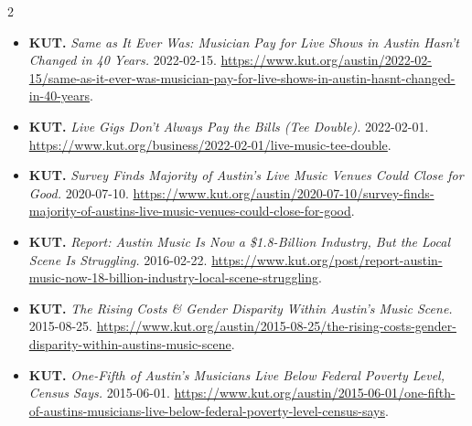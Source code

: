 {\begin{multicols}{2}
\begin{itemize}[itemsep=0pt,topsep=1pt,parsep=0pt,partopsep=0pt,leftmargin=1em]
\item \textbf{KUT.} \textit{Same as It Ever Was: Musician Pay for Live Shows in Austin Hasn’t Changed in 40 Years.} 2022-02-15. \url{https://www.kut.org/austin/2022-02-15/same-as-it-ever-was-musician-pay-for-live-shows-in-austin-hasnt-changed-in-40-years}.
\item \textbf{KUT.} \textit{Live Gigs Don’t Always Pay the Bills (Tee Double).} 2022-02-01. \url{https://www.kut.org/business/2022-02-01/live-music-tee-double}.
\item \textbf{KUT.} \textit{Survey Finds Majority of Austin’s Live Music Venues Could Close for Good.} 2020-07-10. \url{https://www.kut.org/austin/2020-07-10/survey-finds-majority-of-austins-live-music-venues-could-close-for-good}.
\item \textbf{KUT.} \textit{Report: Austin Music Is Now a \$1.8-Billion Industry, But the Local Scene Is Struggling.} 2016-02-22. \url{https://www.kut.org/post/report-austin-music-now-18-billion-industry-local-scene-struggling}.
\item \textbf{KUT.} \textit{The Rising Costs \& Gender Disparity Within Austin’s Music Scene.} 2015-08-25. \url{https://www.kut.org/austin/2015-08-25/the-rising-costs-gender-disparity-within-austins-music-scene}.
\item \textbf{KUT.} \textit{One-Fifth of Austin’s Musicians Live Below Federal Poverty Level, Census Says.} 2015-06-01. \url{https://www.kut.org/austin/2015-06-01/one-fifth-of-austins-musicians-live-below-federal-poverty-level-census-says}.
\end{itemize}

\end{multicols}}
